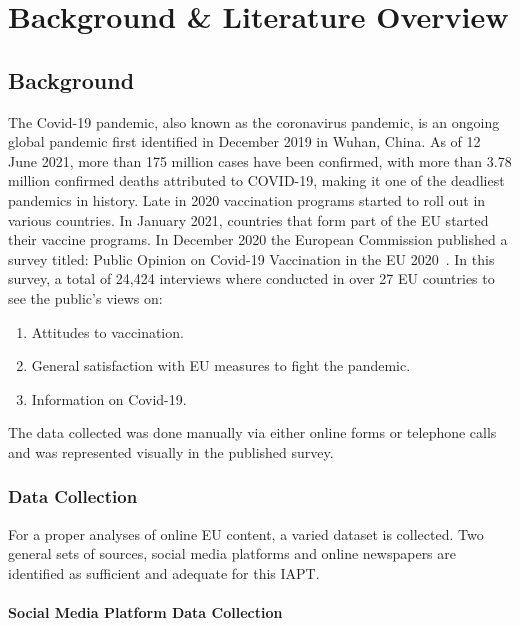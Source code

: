 \chapter{Background \& Literature Overview}

\section{Background}

The Covid-19 pandemic, also known as the coronavirus pandemic, is an ongoing global pandemic first identified in December 2019 in Wuhan, China.
As of 12 June 2021, more than 175 million cases have been confirmed, with more than 3.78 million confirmed deaths attributed to COVID-19, making it one of the deadliest pandemics in history.
Late in 2020 vaccination programs started to roll out in various countries.
In January 2021, countries that form part of the \ac{EU} started their vaccine programs.
In December 2020 the European Commission published a survey titled: Public Opinion on Covid-19 Vaccination in the \ac{EU} 2020~\citep{eupublicopinion}.
In this survey, a total of 24,424 interviews where conducted in over 27 \ac{EU} countries to see the public's views on:

\begin{enumerate}
  \item Attitudes to vaccination.
  \item General satisfaction with EU measures to fight the pandemic.
  \item Information on Covid-19.
\end{enumerate}
\noindent The data collected was done manually via either online forms or telephone calls and was represented visually in the published survey.

\subsection{Data Collection}

For a proper analyses of online \ac{EU} content, a varied dataset is collected.
Two general sets of sources, social media platforms and online newspapers are identified as sufficient and adequate for this \ac{IAPT}.

\subsubsection{Social Media Platform Data Collection}

